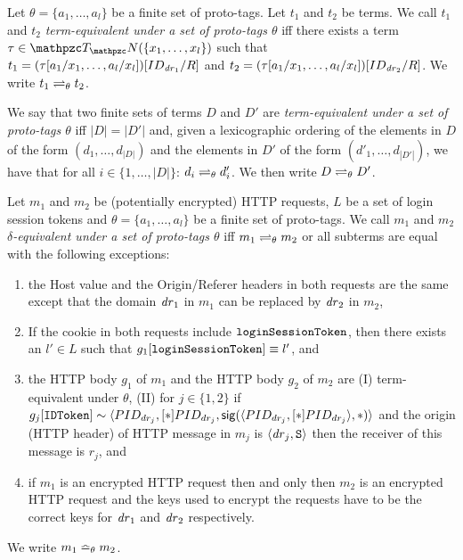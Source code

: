   \begin{definition}
    Let $\theta = \{a_1, \ldots, a_l \}$ be a finite set of proto-tags.
    Let $t_1$ and $t_2$ be terms. We call $t_1$ and $t_2$
    \emph{term-equivalent under a set of proto-tags $\theta$} iff there
    exists a term $\tau \in \terms(\{x_1,\dots,x_l\})$ such that
    $t_1 = (\tau [ a_1 / x_1 , \dots , a_l / x_l ])[ ID_{\mathit{dr}_1} / R ]$ and
    $t_2 = (\tau [ a_1 / x_1 , \dots , a_l / x_l ])[ ID_{\mathit{dr}_2} / R ]$.
    We write $t_1 \rightleftharpoons_{\theta} t_2$.
  
    We say that two finite sets of terms $D$ and $D'$ are
    \emph{term-equivalent under a set of proto-tags $\theta$} iff
    $|D| = |D'|$ and, given a lexicographic ordering of the elements in
    $D$ of the form $(d_1,\dots,d_{|D|})$ and the elements in $D'$ of
    the form $(d'_1,\dots,d_{|D'|})$, we have that for all
    $i \in \{1,\dots,|D|\}$: $d_i \rightleftharpoons_{\theta} d'_i$. We then
    write $D \rightleftharpoons_{\theta} D'$.
  \end{definition}
  
  \begin{definition}
    Let $m_1$ and $m_2$ be (potentially encrypted) HTTP requests, 
    $L$ be a set of login session tokens and
    $\theta = \{a_1, \ldots, a_l \}$ be a finite set of proto-tags. 
    We call $m_1$ and $m_2$ \emph{$\delta$-equivalent under a set of proto-tags $\theta$} 
    iff $m_1 \rightleftharpoons_{\theta} m_2$ or all subterms are equal with the following exceptions:
    \begin{enumerate}
    \item the Host value and the Origin/Referer headers in both requests
      are the same except that the domain $\mathit{dr}_1$ in $m_1$ can be
      replaced by $\mathit{dr}_2$ in $m_2$,
    \item If the cookie in both requests include $\mathtt{loginSessionToken}$, 
      then there exists an $l' \in L$ such that $g_1[\mathtt{loginSessionToken}] \equiv l'$, and
    \item the HTTP body $g_1$ of $m_1$ and the HTTP body $g_2$ of $m_2$
      are (I) term-equivalent under $\theta$, 
      (II) for $j\in \{1,2\}$ if
      $g_j[\mathtt{IDToken}] \sim \langle {{}PID_{dr_j}, [*]PID_{dr_j}, 
      \mathsf{sig}({\langle {{}PID_{dr_j}, [*]PID_{dr_j}} \rangle},{*})} \rangle$
      and the origin (HTTP header) of HTTP message in $m_j$ is
      $\langle\mathit{dr}_j,\mathtt{S}\rangle$ then the receiver of this message is
      $r_j$, and 
    \item if $m_1$ is an encrypted HTTP request then and only then $m_2$
      is an encrypted HTTP request and the keys used to encrypt the
      requests have to be the correct keys for $\mathit{dr}_1$ and
      $\mathit{dr}_2$ respectively.
    \end{enumerate}
    We write $m_1 \bumpeq_{\theta} m_2$.
  \end{definition}
  
